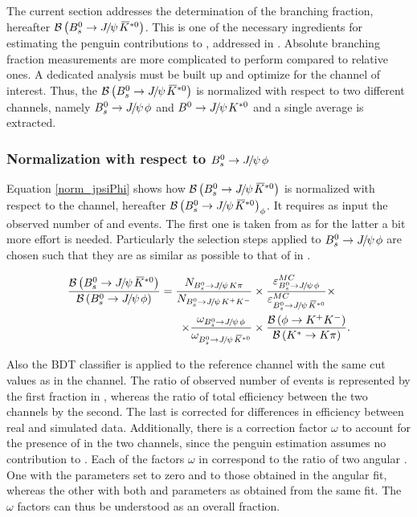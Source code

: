 
The current section addresses the determination of the \BsJpsiKst branching fraction, hereafter $\BRof\BsJpsiKst$.
This is one of the necessary ingredients for estimating the penguin contributions to \phis, addressed in .
Absolute branching fraction measurements are more complicated to perform compared to relative ones. A dedicated analysis
must be built up and optimize for the channel of interest. Thus, the $\BRof\BsJpsiKst$ is normalized with respect
to two different channels, namely $\BsJpsiPhi$ and $\BdJpsiKst$ and a single average is extracted.

\subsubsection{Normalization with respect to $\BsJpsiPhi$}
Equation \ref{norm_jpsiPhi} shows how $\BRof\BsJpsiKst$ is normalized with respect to the \BsJpsiPhi channel, hereafter $\BRof{\BsJpsiKst}_\phi$.
It requires as input the observed number of \BsJpsiKst and \BsJpsiPhi events. The first one is taken from  as for
the latter a bit more effort is needed. Particularly the selection steps applied to $\BsJpsiPhi$
are chosen such that they are as similar as possible to that of \BsJpsiKst in .

\begin{align}
  \centering
\frac{\BRof\BsJpsiKst}{\BRof\BsJpsiPhi} = \frac{N_{\BsJpsiKpi}}{N_{\BsJpsiKK}}
                                  &\times \frac{\varepsilon_{\BsJpsiPhi}^{MC}}{\varepsilon_{\BsJpsiKst}^{MC}}
                                   \times \nonumber \\
                                  \times \frac{\omega_{\BsJpsiPhi}}{\omega_{\BsJpsiKst}}
                                  & \times \frac{\BRof{\phi\to\kaon^+\kaon^-}}{\BRof{\Kstar\to\kaon\pion}}.
\label{norm_jpsiPhi}
\end{align}

\noindent Also the BDT classifier is applied to the reference channel
with the same cut values as in the \BsJpsiKst channel. The ratio of observed number of events is represented by the first fraction in ,
whereas the ratio of total efficiency between the two channels by the second. The last is corrected for differences in efficiency between real and
simulated data. Additionally, there is a correction factor $\omega$ to account for the presence of \swave in the two
channels, since the penguin estimation assumes no \swave contribution to \BsJpsiKst. Each of the factors $\omega$ in
 correspond to the ratio of two angular \pdfs. One with the \swave parameters set to zero and
\pwave to those obtained in the angular fit,  whereas the other with both \pwave and \swave parameters as obtained
from the same fit. The $\omega$ factors can thus be understood as an overall \swave fraction.

